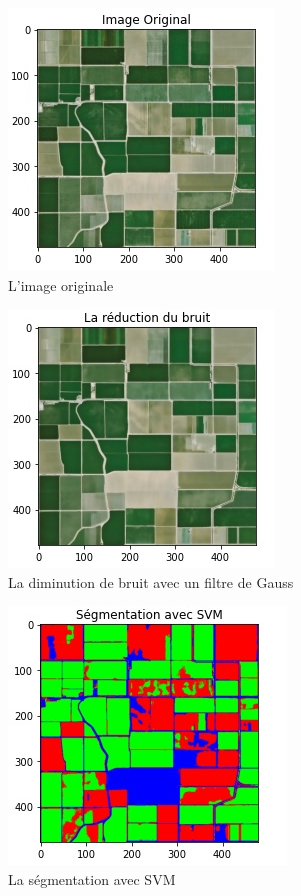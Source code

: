 \documentclass[12pt, openany]{report}
\begin{document}
\begin{figure}[H]
\centering
\includegraphics[scale=1]{imgor.jpg}
\caption{L'image originale}
\end{figure}

\begin{figure}[H]
\centering
\includegraphics[scale=1]{blur.jpg}
\caption{La diminution de bruit avec un filtre de Gauss}
\end{figure}

\begin{figure}[H]
\centering
\includegraphics[scale=1]{svm.jpg}
\caption{La ségmentation avec SVM}
\end{figure}
\end{document}
